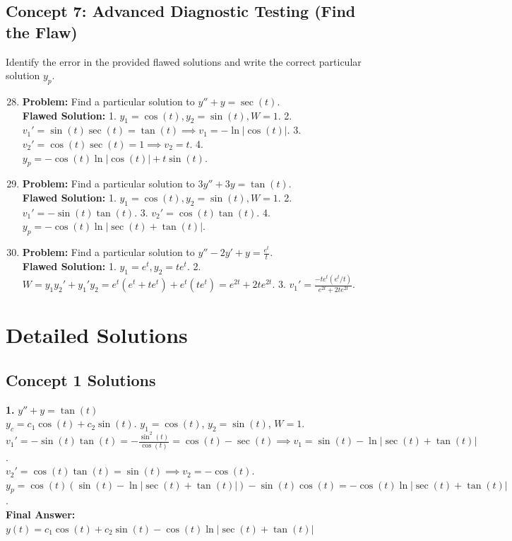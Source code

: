 \documentclass[11pt]{article}
\begin{document}
\subsection*{Concept 7: Advanced Diagnostic Testing (Find the Flaw)}
Identify the error in the provided flawed solutions and write the correct particular solution $y_p$.
\begin{enumerate}
    \setcounter{enumi}{27}
    \item \textbf{Problem:} Find a particular solution to $y'' + y = \sec(t)$. \\
    \textbf{Flawed Solution:} 1. $y_1 = \cos(t), y_2 = \sin(t), W = 1$. 2. $v_1' = \sin(t)\sec(t) = \tan(t) \implies v_1 = -\ln|\cos(t)|$. 3. $v_2' = \cos(t)\sec(t) = 1 \implies v_2 = t$. 4. $y_p = -\cos(t)\ln|\cos(t)| + t\sin(t)$.
    
    \item \textbf{Problem:} Find a particular solution to $3y'' + 3y = \tan(t)$. \\
    \textbf{Flawed Solution:} 1. $y_1 = \cos(t), y_2 = \sin(t), W = 1$. 2. $v_1' = -\sin(t)\tan(t)$. 3. $v_2' = \cos(t)\tan(t)$. 4. $y_p = -\cos(t)\ln|\sec(t)+\tan(t)|$.
    
    \item \textbf{Problem:} Find a particular solution to $y'' - 2y' + y = \frac{e^t}{t}$. \\
    \textbf{Flawed Solution:} 1. $y_1 = e^t, y_2 = te^t$. 2. $W = y_1 y_2' + y_1' y_2 = e^t(e^t + te^t) + e^t(te^t) = e^{2t} + 2te^{2t}$. 3. $v_1' = \frac{-te^t(e^t/t)}{e^{2t} + 2te^{2t}}$.
\end{enumerate}

\newpage

\section{Detailed Solutions}

\subsection*{Concept 1 Solutions}
\textbf{1.} $y'' + y = \tan(t)$ \\
$y_c = c_1\cos(t) + c_2\sin(t)$. $y_1 = \cos(t)$, $y_2 = \sin(t)$, $W = 1$. \\
$v_1' = -\sin(t)\tan(t) = -\frac{\sin^2(t)}{\cos(t)} = \cos(t) - \sec(t) \implies v_1 = \sin(t) - \ln|\sec(t) + \tan(t)|$. \\
$v_2' = \cos(t)\tan(t) = \sin(t) \implies v_2 = -\cos(t)$. \\
$y_p = \cos(t)(\sin(t) - \ln|\sec(t) + \tan(t)|) - \sin(t)\cos(t) = -\cos(t)\ln|\sec(t) + \tan(t)|$. \\
\textbf{Final Answer:} $y(t) = c_1\cos(t) + c_2\sin(t) - \cos(t)\ln|\sec(t) + \tan(t)|$
\end{document}
